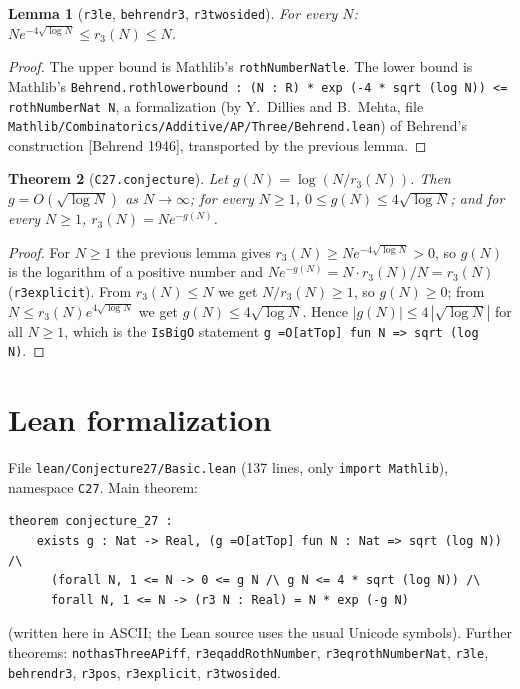 \documentclass[11pt]{article}
\newtheorem{theorem}{Theorem}
\newtheorem{lemma}[theorem]{Lemma}
\theoremstyle{definition}
\theoremstyle{remark}
\renewcommand{\_}{\oldus\allowbreak}
\begin{document}
\begin{lemma}[\texttt{r3\_le}, \texttt{behrend\_r3}, \texttt{r3\_two\_sided}]
For every $N$: $N e^{-4\sqrt{\log N}} \le r_3(N) \le N$.
\end{lemma}
\begin{proof}
The upper bound is Mathlib's \texttt{rothNumberNat\_le}. The lower bound is Mathlib's
\texttt{Behrend.roth\_lower\_bound : (N : R) * exp (-4 * sqrt (log N)) <= rothNumberNat N}, a formalization
(by Y.~Dillies and B.~Mehta, file \texttt{Mathlib/Combinatorics/Additive/AP/Three/Behrend.lean}) of
Behrend's construction [Behrend 1946], transported by the previous lemma.
\end{proof}

\begin{theorem}[\texttt{C27.conjecture\_27}]
Let $g(N) = \log(N / r_3(N))$. Then $g = O(\sqrt{\log N})$ as $N\to\infty$; for every $N \ge 1$,
$0 \le g(N) \le 4\sqrt{\log N}$; and for every $N\ge1$, $r_3(N) = N e^{-g(N)}$.
\end{theorem}
\begin{proof}
For $N \ge 1$ the previous lemma gives $r_3(N) \ge N e^{-4\sqrt{\log N}} > 0$, so $g(N)$ is the logarithm
of a positive number and $N e^{-g(N)} = N \cdot r_3(N)/N = r_3(N)$ (\texttt{r3\_explicit}). From
$r_3(N)\le N$ we get $N/r_3(N) \ge 1$, so $g(N)\ge 0$; from $N \le r_3(N) e^{4\sqrt{\log N}}$ we get
$g(N) \le 4\sqrt{\log N}$. Hence $|g(N)| \le 4\,|\sqrt{\log N}|$ for all $N \ge 1$, which is the
\texttt{IsBigO} statement \texttt{g =O[atTop] fun N => sqrt (log N)}.
\end{proof}

\section{Lean formalization}

File \texttt{lean/Conjecture27/Basic.lean} (137 lines, only \texttt{import Mathlib}), namespace
\texttt{C27}. Main theorem:
\begin{verbatim}
theorem conjecture_27 :
    exists g : Nat -> Real, (g =O[atTop] fun N : Nat => sqrt (log N)) /\
      (forall N, 1 <= N -> 0 <= g N /\ g N <= 4 * sqrt (log N)) /\
      forall N, 1 <= N -> (r3 N : Real) = N * exp (-g N)
\end{verbatim}
(written here in ASCII; the Lean source uses the usual Unicode symbols). Further theorems:
\texttt{not\_hasThreeAP\_iff}, \texttt{r3\_eq\_addRothNumber}, \texttt{r3\_eq\_rothNumberNat},
\texttt{r3\_le}, \texttt{behrend\_r3}, \texttt{r3\_pos}, \texttt{r3\_explicit}, \texttt{r3\_two\_sided}.
\end{document}
